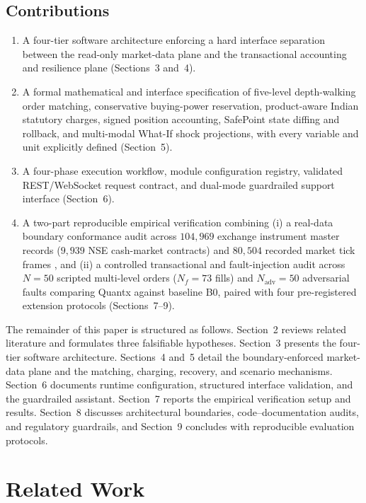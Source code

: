 \documentclass[journal,onecolumn,10pt]{IEEEtran}
\begin{document}
\subsection{Contributions}
\begin{enumerate}
  \item A four-tier software architecture enforcing a hard interface separation between the read-only market-data plane and the transactional accounting and resilience plane (Sections~3 and~4).
  \item A formal mathematical and interface specification of five-level depth-walking order matching, conservative buying-power reservation, product-aware Indian statutory charges, signed position accounting, SafePoint state diffing and rollback, and multi-modal What-If shock projections, with every variable and unit explicitly defined (Section~5).
  \item A four-phase execution workflow, module configuration registry, validated REST/WebSocket request contract, and dual-mode guardrailed support interface (Section~6).
  \item A two-part reproducible empirical verification combining (i) a real-data boundary conformance audit across $104{,}969$ exchange instrument master records ($9{,}939$ NSE cash-market contracts) and $80{,}504$ recorded market tick frames \cite{quantx_dataset}, and (ii) a controlled transactional and fault-injection audit across $N=50$ scripted multi-level orders ($N_f=73$ fills) and $N_{\mathrm{adv}}=50$ adversarial faults comparing Quantx against baseline B0, paired with four pre-registered extension protocols (Sections~7--9).
\end{enumerate}

The remainder of this paper is structured as follows. Section~2 reviews related literature and formulates three falsifiable hypotheses. Section~3 presents the four-tier software architecture. Sections~4 and~5 detail the boundary-enforced market-data plane and the matching, charging, recovery, and scenario mechanisms. Section~6 documents runtime configuration, structured interface validation, and the guardrailed assistant. Section~7 reports the empirical verification setup and results. Section~8 discusses architectural boundaries, code--documentation audits, and regulatory guardrails, and Section~9 concludes with reproducible evaluation protocols.

\section{Related Work}
\end{document}
